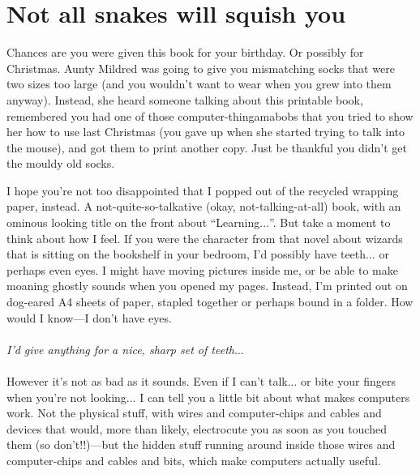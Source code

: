 

\chapter{Not all snakes will squish you}\label{ch:notallsnakeswillsquishyou}

Chances are you were given this book for your birthday.  Or possibly for Christmas.  Aunty Mildred was going to give you mismatching socks that were two sizes too large (and you wouldn't want to wear when you grew into them anyway).  Instead, she heard someone talking about this printable book, remembered you had one of those computer-thingamabobs that you tried to show her how to use last Christmas (you gave up when she started trying to talk into the mouse), and got them to print another copy.  Just be thankful you didn't get the mouldy old socks.

I hope you're not too disappointed that I popped out of the recycled wrapping paper, instead.  A not-quite-so-talkative (okay, not-talking-at-all) book, with an ominous looking title on the front about ``Learning$\ldots$''.
But take a moment to think about how I feel.  If you were the character from that novel about wizards that is sitting on the bookshelf in your bedroom, I'd possibly have teeth... or perhaps even eyes.  I might have moving pictures inside me, or be able to make moaning ghostly sounds when you opened my pages.  Instead, I'm printed out on dog-eared A4 sheets of paper, stapled together or perhaps bound in a folder.  How would I know---I don't have eyes.
\\
\\
\emph{I'd give anything for a nice, sharp set of teeth$\ldots$}
\\
\\
However it's not as bad as it sounds.  Even if I can't talk... or bite your fingers when you're not looking... I can tell you a little bit about what makes computers work.  Not the physical stuff, with wires and computer-chips and cables and devices that would, more than likely, electrocute you as soon as you touched them (so don't!!)---but the hidden stuff running around inside those wires and computer-chips and cables and bits, which make computers actually useful.

